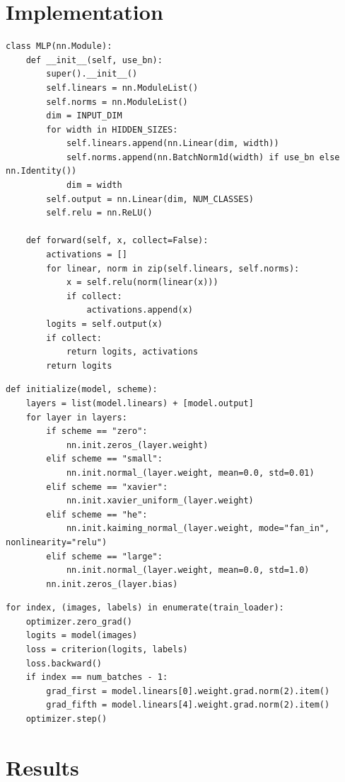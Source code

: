 \documentclass[12pt]{article}
\begin{document}
\section{Implementation}

\begin{lstlisting}
class MLP(nn.Module):
    def __init__(self, use_bn):
        super().__init__()
        self.linears = nn.ModuleList()
        self.norms = nn.ModuleList()
        dim = INPUT_DIM
        for width in HIDDEN_SIZES:
            self.linears.append(nn.Linear(dim, width))
            self.norms.append(nn.BatchNorm1d(width) if use_bn else nn.Identity())
            dim = width
        self.output = nn.Linear(dim, NUM_CLASSES)
        self.relu = nn.ReLU()

    def forward(self, x, collect=False):
        activations = []
        for linear, norm in zip(self.linears, self.norms):
            x = self.relu(norm(linear(x)))
            if collect:
                activations.append(x)
        logits = self.output(x)
        if collect:
            return logits, activations
        return logits
\end{lstlisting}

\begin{lstlisting}
def initialize(model, scheme):
    layers = list(model.linears) + [model.output]
    for layer in layers:
        if scheme == "zero":
            nn.init.zeros_(layer.weight)
        elif scheme == "small":
            nn.init.normal_(layer.weight, mean=0.0, std=0.01)
        elif scheme == "xavier":
            nn.init.xavier_uniform_(layer.weight)
        elif scheme == "he":
            nn.init.kaiming_normal_(layer.weight, mode="fan_in", nonlinearity="relu")
        elif scheme == "large":
            nn.init.normal_(layer.weight, mean=0.0, std=1.0)
        nn.init.zeros_(layer.bias)
\end{lstlisting}

\begin{lstlisting}
for index, (images, labels) in enumerate(train_loader):
    optimizer.zero_grad()
    logits = model(images)
    loss = criterion(logits, labels)
    loss.backward()
    if index == num_batches - 1:
        grad_first = model.linears[0].weight.grad.norm(2).item()
        grad_fifth = model.linears[4].weight.grad.norm(2).item()
    optimizer.step()
\end{lstlisting}

\section{Results}
\end{document}
